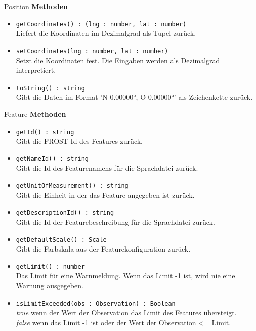     \begin{Class}{Position}
        \textbf{Methoden}
        \begin{itemize}
            \item \texttt{getCoordinates() : (lng : number, lat : number)}
            \\ Liefert die Koordinaten im Dezimalgrad als Tupel zurück.
            \item \texttt{setCoordinates(lng : number, lat : number)}
            \\ Setzt die Koordinaten fest. Die Eingaben werden als Dezimalgrad interpretiert.

            \item \texttt{toString() : string}
            \\ Gibt die Daten im Format 'N 0.00000°, O 0.00000°' als Zeichenkette zurück.
        \end{itemize}
    \end{Class}

    \begin{Class}{Feature}
        \textbf{Methoden}
        \begin{itemize}
            \item \texttt{getId() : string}
            \\ Gibt die FROST-Id des Features zurück.
            \item \texttt{getNameId() : string}
            \\ Gibt die Id des Featurenamens für die Sprachdatei zurück.
            \item \texttt{getUnitOfMeasurement() : string}
            \\ Gibt die Einheit in der das Feature angegeben ist zurück.
            \item \texttt{getDescriptionId() : string}
            \\ Gibt die Id der Featurebeschreibung für die Sprachdatei zurück.
            \item \texttt{getDefaultScale() : Scale}
            \\ Gibt die Farbskala aus der Featurekonfiguration zurück.
            \item \texttt{getLimit() : number}
            \\ Das Limit für eine Warnmeldung. Wenn das Limit -1 ist, wird nie eine Warnung ausgegeben.
            \item \texttt{isLimitExceeded(obs : Observation) : Boolean}
            \\ \emph{true} wenn der Wert der Observation das Limit des Features übersteigt.
            \\ \emph{false} wenn das Limit -1 ist oder der Wert der Observation <= Limit.
        \end{itemize}
    \end{Class}

